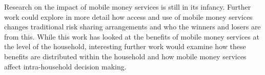Research on the impact of mobile money services is still in its infancy. Further work could explore in more detail how access and use of mobile money services changes traditional risk sharing arrangements and who the winners and losers are from this. While this work has looked at the benefits of mobile money services at the level of the household, interesting further work would examine how these benefits are distributed within the household and how mobile money services affect intra-household decision making. 


